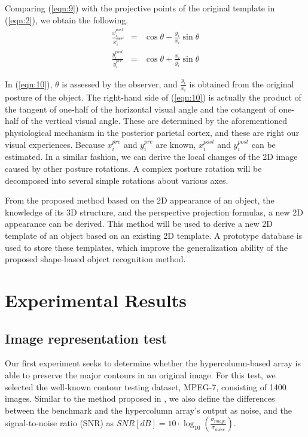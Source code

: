\documentclass[journal]{IEEEtran}
\begin{document}
Comparing (\ref{eqn:9}) with the projective points of the original template in (\ref{eqn:2}),
we obtain the following.
\begin{eqnarray}
\frac{x_i^{post}}{x_i^{pre}}&=&\cos\theta-\frac{y_i}{x_i}\sin\theta \nonumber\\
\frac{y_i^{post}}{y_i^{pre}}&=&\cos\theta+\frac{x_i}{y_i}\sin\theta
\label{eqn:10}
\end{eqnarray}

In (\ref{eqn:10}), $\theta$ is assessed by the observer, 
and $\frac{y_i}{x_i}$ is obtained from the original posture of the object. 
The right-hand side of (\ref{eqn:10}) is actually the product of the tangent of one-half of the horizontal visual angle and the cotangent of one-half of the vertical visual angle. 
These are determined by the aforementioned physiological mechanism in the posterior parietal cortex, 
and these are right our visual experiences. 
Because $x_i^{pre}$ and $y_i^{pre}$ are known, $x_i^{post}$ and $y_i^{post}$ can be estimated. 
In a similar fashion, we can derive the local changes of the 2D image caused by other posture rotations. 
A complex posture rotation will be decomposed into several simple rotations about various axes.

From the proposed method based on the 2D appearance of an object, 
the knowledge of its 3D structure, and the perspective projection formulas, 
a new 2D appearance can be derived. 
This method will be used to derive a new 2D template of an object based on an existing 2D template. 
A prototype database is used to store these templates, 
which improve the generalization ability of the proposed shape-based object recognition method.

\section{Experimental Results}

\subsection{Image representation test}

Our first experiment seeks to determine whether the hypercolumn-based array is able to preserve the major contours in an original image. 
For this test, we selected the well-known contour testing dataset, MPEG-7, consisting of 1400 images. 
Similar to the method proposed in \cite{russ1995}, 
we also define the differences between the benchmark and the hypercolumn array's output as noise, 
and the signal-to-noise ratio (SNR) as $SNR[dB]=10\cdot\log_10(\frac{\sigma_{image}}{\sigma_{noise}})$.
\end{document}
